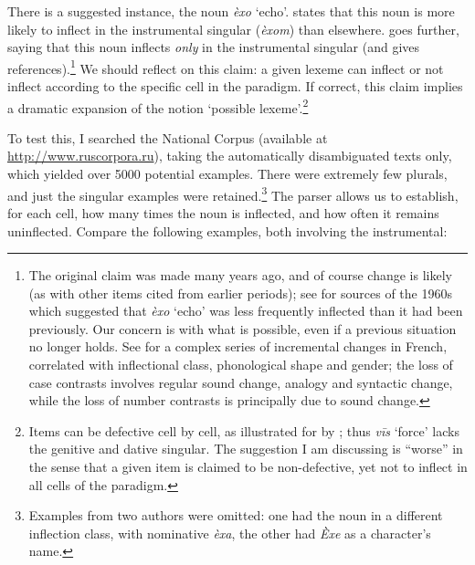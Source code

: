 \documentclass[output=paper,colorlinks,citecolor=brown]{langscibook}
\begin{document}
There is a suggested instance, the  noun \textit{èxo} `echo'. \citet[133--134]{unbegaun1947} states that this noun is more likely to inflect in the instrumental singular (\textit{èxom}) than elsewhere. \citet[182--183]{thomas1983} goes further, saying that this noun inflects \textit{only} in the instrumental singular (and gives references).\footnote{The original claim was made many years ago, and of course change is likely (as with other items cited from earlier periods); see \citet[120]{comriestonepolinsky1996} for sources of the 1960s which suggested that \textit{èxo} `echo' was less frequently inflected than it had been previously. Our concern is with what is possible, even if a previous situation no longer holds. See \citet{esher2025} for a complex series of incremental changes in French, correlated with inflectional class, phonological shape and gender; the loss of case contrasts involves regular sound change, analogy and syntactic change, while the loss of number contrasts is principally due to sound change.} We should reflect on this claim: a given lexeme can inflect or not inflect according to the specific cell in the paradigm. If correct, this claim implies a dramatic expansion of the notion `possible lexeme'.\footnote{Items can be
defective cell by cell, as illustrated for  by \citet[229]{rhodes1987}; thus \textit{vīs} `force' lacks the genitive and dative singular. The suggestion I am discussing is ``worse'' in the sense that a given item is claimed to be non-defective, yet not to inflect in all cells of the paradigm.}

To test this, I searched the  National Corpus (available at \href{http://www.ruscorpora.ru}{\url{http://www.ruscorpora.ru}}), taking the automatically disambiguated texts only, which yielded over 5000 potential examples. There were extremely few plurals, and just the singular examples were retained.\footnote{Examples from two authors were omitted: one had the noun in a different inflection class, with nominative \textit{èxa}, the other had \textit{Èxe} as a character's name.} The parser allows us to establish, for each cell, how many times the noun is inflected, and how often it remains uninflected. Compare the following examples, both involving the instrumental:

\end{document}

